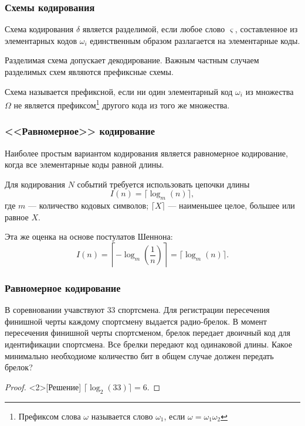 \begin{frame}
    \frametitle{Схемы кодирования}

    \begin{definition}
        Схема кодирования $\delta$ является \alert{разделимой}, если любое слово $\varsigma$, составленное из элементарных кодов $\omega_i$ единственным образом разлагается на элементарные коды.
    \end{definition} 
    Разделимая схема допускает декодирование. Важным частным случаем \alert{разделимых} схем являются \alert{префиксные} схемы.
    \begin{definition}
        Схема называется \alert{префиксной}, если ни один элементарный код $\omega_i$ из множества $\Omega$ не является префиксом\footnote{Префиксом слова $\omega$ называется слово $\omega_1$, если $\omega=\omega_1\omega_2$} другого кода из того же множества.
    \end{definition} 
\end{frame}

\begin{frame}
    \frametitle{<<Равномерное>> кодирование}
    
    Наиболее простым вариантом кодирования является \alert{равномерное} кодирование, когда все элементарные коды равной длины.
    
    Для кодирования $N$ событий требуется использовать цепочки длины
    \[
        I(n)=\lceil\log_m(n)\rceil,
    \]
    где $m$ --- количество кодовых символов; $\lceil X \rceil$ --- наименьшее целое, большее или равное $X$.
    
    Эта же оценка на основе постулатов Шеннона:
    \[
        I(n)=\left\lceil -\log_m\left(\frac{1}{n}\right) \right\rceil=\lceil \log_m(n) \rceil.
    \]
\end{frame}

\begin{frame}
    \frametitle{Равномерное кодирование}

    \begin{example}
        В соревновании учавствуют $33$ спортсмена. Для регистрации пересечения финишной черты каждому спортсмену выдается радио-брелок. В момент пересечения финишной черты спортсменом, брелок передает двоичный код для идентификации спортсмена. Все брелки передают код одинаковой длины. Какое минимально необходиоме количество бит в общем случае должен передать брелок?
    \end{example}
    \begin{proof}<2>[Решение] 
        $\lceil \log_2(33)\rceil = 6$.
    \end{proof}
\end{frame}

